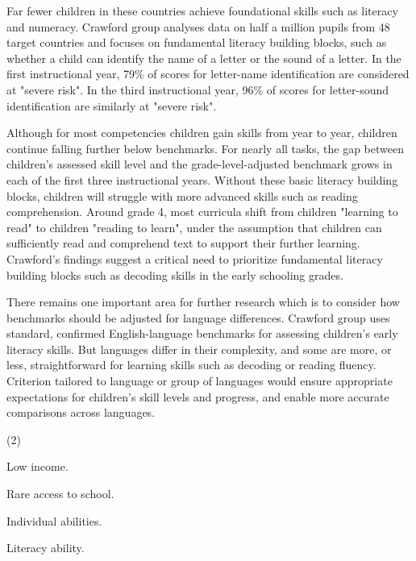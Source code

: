 \documentclass{英语试卷}
\begin{document}
\par Far fewer children in these countries achieve foundational skills such as literacy and numeracy. Crawford group analyses data on half a million pupils from 48 target countries and focuses on fundamental literacy building blocks, such as whether a child can identify the name of a letter or the sound of a letter. In the first instructional year, 79\% of scores for letter-name identification are considered at "severe risk". In the third instructional year, 96\% of scores for letter-sound identification are similarly at "severe risk".\par
\par Although for most competencies children gain skills from year to year, children continue falling further below benchmarks. For nearly all tasks, the gap between children's assessed skill level and the grade-level-adjusted benchmark grows in each of the first three instructional years. Without these basic literacy building blocks, children will struggle with more advanced skills such as reading comprehension. Around grade 4, most curricula shift from children "learning to read" to children "reading to learn", under the assumption that children can sufficiently read and comprehend text to support their further learning. Crawford's findings suggest a critical need to prioritize fundamental literacy building blocks such as decoding skills in the early schooling grades.\par
\par There remains one important area for further research which is to consider how benchmarks should be adjusted for language differences. Crawford group uses standard, confirmed English-language benchmarks for assessing children's early literacy skills. But languages differ in their complexity, and some are more, or less, straightforward for learning skills such as decoding or reading fluency. Criterion tailored to language or group of languages would ensure appropriate expectations for children's skill levels and progress, and enable more accurate comparisons across languages.\par
{}
\begin{choices}(2)
  \item Low income.
  \item Rare access to school.
  \item Individual abilities.
  \item Literacy ability.
\end{choices}
\end{document}

